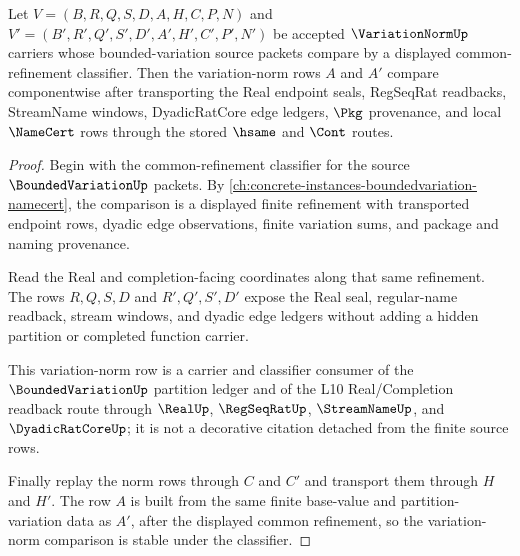 \begin{theorem}
\label{thm:variation-norm-refinement-stability}
Let $V=(B,R,Q,S,D,A,H,C,P,N)$ and $V'=(B',R',Q',S',D',A',H',C',P',N')$ be accepted $\VariationNormUp$ carriers whose bounded-variation source packets compare by a displayed common-refinement classifier. Then the variation-norm rows $A$ and $A'$ compare componentwise after transporting the Real endpoint seals, RegSeqRat readbacks, StreamName windows, DyadicRatCore edge ledgers, $\Pkg$ provenance, and local $\NameCert$ rows through the stored $\hsame$ and $\Cont$ routes.
\end{theorem}
\begin{proof}
Begin with the common-refinement classifier for the source $\BoundedVariationUp$ packets. By \autoref{ch:concrete-instances-boundedvariation-namecert}, the comparison is a displayed finite refinement with transported endpoint rows, dyadic edge observations, finite variation sums, and package and naming provenance.

Read the Real and completion-facing coordinates along that same refinement. The rows $R,Q,S,D$ and $R',Q',S',D'$ expose the Real seal, regular-name readback, stream windows, and dyadic edge ledgers without adding a hidden partition or completed function carrier.

This variation-norm row is a carrier and classifier consumer of the $\BoundedVariationUp$ partition ledger and of the L10 Real/Completion readback route through $\RealUp$, $\RegSeqRatUp$, $\StreamNameUp$, and $\DyadicRatCoreUp$; it is not a decorative citation detached from the finite source rows.

Finally replay the norm rows through $C$ and $C'$ and transport them through $H$ and $H'$. The row $A$ is built from the same finite base-value and partition-variation data as $A'$, after the displayed common refinement, so the variation-norm comparison is stable under the classifier.
\end{proof}


